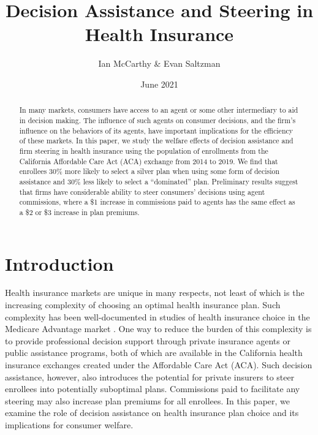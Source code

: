 \documentclass[12pt]{article}
\begin{document}
\title{Decision Assistance and Steering in Health Insurance}
\author{Ian McCarthy \& Evan Saltzman}
\date{June 2021}
\maketitle

\vspace{-2ex}
\begin{abstract}
\noindent In many markets, consumers have access to an agent or some other intermediary to aid in decision making. The influence of such agents on consumer decisions, and the firm's influence on the behaviors of its agents, have important implications for the efficiency of these markets. In this paper, we study the welfare effects of decision assistance and firm steering in health insurance using the population of enrollments from the California Affordable Care Act (ACA) exchange from 2014 to 2019. We find that enrollees 30\% more likely to select a silver plan when using some form of decision assistance and 30\% less likely to select a ``dominated'' plan. Preliminary results suggest that firms have considerable ability to steer consumers' decisions using agent commissions, where a \$1 increase in commissions paid to agents has the same effect as a \$2 or \$3 increase in plan premiums.
\end{abstract}

\clearpage

\section{Introduction}
\label{sec:introduction}

Health insurance markets are unique in many respects, not least of which is the increasing complexity of choosing an optimal health insurance plan. Such complexity has been well-documented in studies of health insurance choice in the Medicare Advantage market \citep{abaluck2011, ketcham2012, gruber2017}. One way to reduce the burden of this complexity is to provide professional decision support through private insurance agents or public assistance programs, both of which are available in the California health insurance exchanges created under the Affordable Care Act (ACA). Such decision assistance, however, also introduces the potential for private insurers to steer enrollees into potentially suboptimal plans. Commissions paid to facilitate any steering may also increase plan premiums for all enrollees. In this paper, we examine the role of decision assistance on health insurance plan choice and its implications for consumer welfare.
\end{document}

